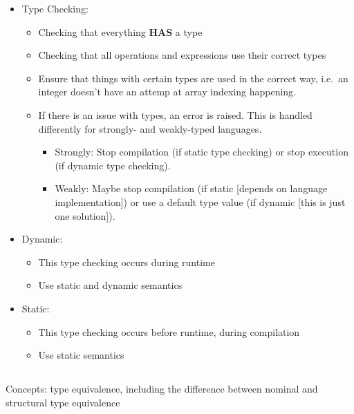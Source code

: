\begin{itemize}
\item Type Checking:
  \begin{itemize}[noitemsep]
  \item Checking that everything \textbf{HAS} a type
  \item Checking that all operations and expressions use their correct types
  \item Ensure that things with certain types are used in the correct way, i.e.\ an integer doesn't have an attemp at array indexing happening.
  \item If there is an issue with types, an error is raised. This is handled differently for strongly- and weakly-typed languages.
    \begin{itemize}[noitemsep]
    \item Strongly: Stop compilation (if static type checking) or stop execution (if dynamic type checking).
    \item Weakly: Maybe stop compilation (if static [depends on language implementation]) or use a default type value (if dynamic [this is just one solution]).
    \end{itemize}
  \end{itemize}

\item Dynamic:
  \begin{itemize}[noitemsep]
  \item This type checking occurs during runtime
  \item Use static and dynamic semantics
  \end{itemize}

\item Static:
  \begin{itemize}[noitemsep]
  \item This type checking occurs before runtime, during compilation
  \item Use static semantics
  \end{itemize}
\end{itemize}

\subsection{}
Concepts: type equivalence, including the difference between nominal and structural type equivalence

